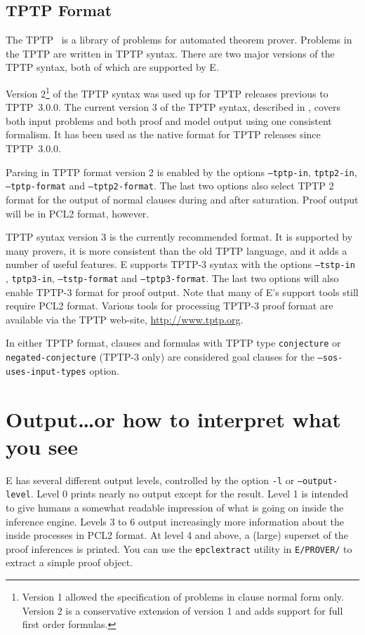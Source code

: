 \documentclass{article}
\begin{document}
\subsection{TPTP Format}

The TPTP~\cite{Sutcliffe:TPTP-WWW} is a library of problems for
automated theorem prover. Problems in the TPTP are written in TPTP
syntax. There are two major versions of the TPTP syntax, both of which
are supported by E.

Version 2\footnote{Version 1 allowed the specification of problems in
  clause normal form only. Version 2 is a conservative extension of
  version 1 and adds support for full first order formulas.} of the
TPTP syntax was used up for TPTP releases previous to TPTP~3.0.0.  The
current version 3 of the TPTP syntax, described in
\cite{GSCG:IJCAR-2006}, covers both input problems and both proof and
model output using one consistent formalism. It has been used as the
native format for TPTP releases since TPTP~3.0.0.

Parsing in TPTP format version 2 is enabled by the options
\texttt{--tptp-in}, \texttt{tptp2-in}, \texttt{--tptp-format} and
\texttt{--tptp2-format}. The last two options also select TPTP 2
format for the output of normal clauses during and after
saturation. Proof output will be in PCL2 format, however.

TPTP syntax version 3 is the currently recommended format. It is
supported by many provers, it is more consistent than the old TPTP
language, and it adds a number of useful features.  E supports TPTP-3
syntax with the options \texttt{--tstp-in} , \texttt{tptp3-in},
\texttt{--tstp-format} and \texttt{--tptp3-format}. The last two
options will also enable TPTP-3 format for proof output. Note that
many of E's support tools still require PCL2 format. Various tools for
processing TPTP-3 proof format are available via the TPTP web-site,
\url{http://www.tptp.org}.

In either TPTP format, clauses and formulas with TPTP type
\texttt{conjecture} or \texttt{negated-conjecture} (TPTP-3 only) are
considered goal clauses for the \texttt{--sos-uses-input-types}
option.



\section{Output\ldots or how to interpret what you see}
\label{sec:output}

E has several different output levels, controlled by the option
\texttt{-l} or \texttt{--output-level}. Level 0 prints nearly no
output except for the result. Level 1 is intended to give humans a
somewhat readable impression of what is going on inside the inference
engine.  Levels 3 to 6 output increasingly more information about the
inside processes in PCL2 format. At level 4 and above, a (large)
superset of the proof inferences is printed. You can use the
\texttt{epclextract} utility in \texttt{E/PROVER/} to extract a simple
proof object.
\end{document}
